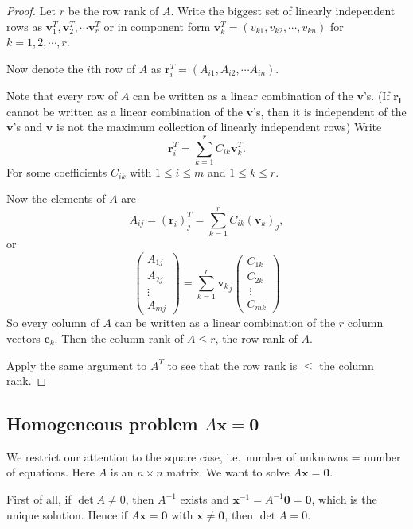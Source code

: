 \documentclass[a4paper]{article}
\begin{document}
\begin{proof}
  Let $r$ be the row rank of $A$. Write the biggest set of linearly independent rows as $\mathbf{v}_1^T, \mathbf{v}_2^T, \cdots \mathbf{v}_r^T$ or in component form $\mathbf{v}_k^T = (v_{k1}, v_{k2}, \cdots, v_{kn})$ for $k = 1, 2, \cdots, r$.

  Now denote the $i$th row of $A$ as $\mathbf{r}_i^T = (A_{i1}, A_{i2}, \cdots A_{in})$.

  Note that every row of $A$ can be written as a linear combination of the $\mathbf{v}$'s. (If $\mathbf{r_i}$ cannot be written as a linear combination of the $\mathbf{v}$'s, then it is independent of the $\mathbf{v}$'s and $\mathbf{v}$ is not the maximum collection of linearly independent rows) Write
  \[
    \mathbf{r}_i^T = \sum_{k = 1}^r C_{ik}\mathbf{v}_{k}^T.
  \]
  For some coefficients $C_{ik}$ with $1 \leq i\leq m$ and $1 \leq k \leq r$.

  Now the elements of $A$ are
  \[
    A_{ij} = (\mathbf{r}_i)^T_j = \sum_{k = 1}^r C_{ik}(\mathbf{v}_k)_j,
  \]
  or
  \[
    \begin{pmatrix}
      A_{1j}\\
      A_{2j}\\
      \vdots\\
      A_{mj}
    \end{pmatrix} = \sum_{k = 1}^r {\mathbf{v}_k}_j
    \begin{pmatrix}
      C_{1k}\\
      C_{2k}\\\
      \vdots\\
      C_{mk}
    \end{pmatrix}
  \]
  So every column of $A$ can be written as a linear combination of the $r$ column vectors $\mathbf{c}_k$. Then the column rank of $A \leq r$, the row rank of $A$.

  Apply the same argument to $A^T$ to see that the row rank is $\leq$ the column rank.
\end{proof}

\subsection{Homogeneous problem \texorpdfstring{$A\mathbf{x} = \mathbf{0}$}{Ax = 0}}
We restrict our attention to the square case, i.e.\ number of unknowns = number of equations. Here $A$ is an $n\times n$ matrix. We want to solve $A\mathbf{x} = \mathbf{0}$.

First of all, if $\det A\not=0$, then $A^{-1}$ exists and $\mathbf{x}^{-1} = A^{-1}\mathbf{0} = \mathbf{0}$, which is the unique solution. Hence if $A\mathbf{x} = \mathbf{0}$ with $\mathbf{x} \not= \mathbf{0}$, then $\det A = 0$.
\end{document}
